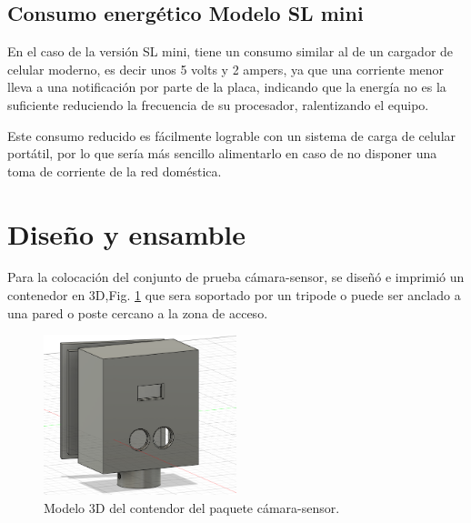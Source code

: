 \subsection{Consumo energético Modelo SL mini}

En el caso de la versión SL mini, tiene un consumo similar al de un cargador de celular moderno, es decir unos 5 volts y
2 ampers, ya que una corriente menor lleva a una notificación por parte de la placa, indicando que la energía no es la 
suficiente reduciendo la frecuencia de su procesador, ralentizando el equipo.

Este consumo reducido es fácilmente lograble con un sistema de carga de celular portátil, por lo que sería más sencillo 
alimentarlo en caso de no disponer una toma de corriente de la red doméstica.

\section{Diseño y ensamble}

Para la colocación del conjunto de prueba cámara-sensor, se diseñó e imprimió un contenedor en 3D,Fig. \ref{fig:contenedor-camara}
que sera soportado por un tripode o puede ser anclado a una pared o poste cercano a la zona de acceso.
\begin{figure}
    \centering
    \includegraphics[width=0.5\textwidth]{imgs/contenedor-camara.png}
    \caption{Modelo 3D del contendor del paquete cámara-sensor.}
    \label{fig:contenedor-camara}
\end{figure}